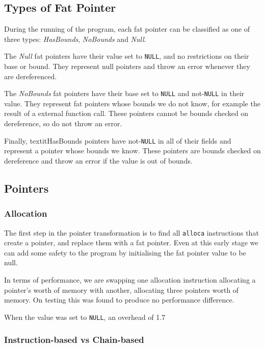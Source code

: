 \subsection{Types of Fat Pointer}

During the running of the program, each fat pointer can be classified as one of three types: \textit{HasBounds}, \textit{NoBounds} and \textit{Null}.

The \textit{Null} fat pointers have their value set to \verb!NULL!, and no restrictions on their base or bound.
They represent null pointers and throw an error whenever they are dereferenced.

The \textit{NoBounds} fat pointers have their base set to \verb!NULL! and not-\verb!NULL! in their value.
They represent fat pointers whose bounds we do not know, for example the result of a external function call.
These pointers cannot be bounds checked on dereference, so do not throw an error.

Finally, textit{HasBounds} pointers have not-\verb!NULL! in all of their fields and represent a pointer whose bounds we know.
These pointers are bounds checked on dereference and throw an error if the value is out of bounds.

\subsection{Pointers}

\subsubsection{Allocation}

The first step in the pointer transformation is to find all \verb!alloca! instructions that create a pointer, and replace them with a fat pointer.
Even at this early stage we can add some safety to the program by initialising the fat pointer value to be null.

In terms of performance, we are swapping one allocation instruction allocating a pointer's worth of memory with another, allocating three pointers worth of memory. 
On testing this was found to produce no performance difference.

When the value was set to \verb!NULL!, an overhead of 1.7%

\subsubsection{Instruction-based vs Chain-based}

